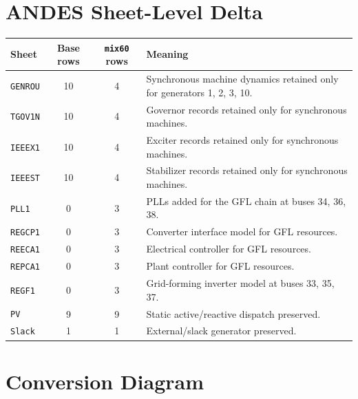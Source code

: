\documentclass[10pt,letterpaper]{article}
\begin{document}
\section{ANDES Sheet-Level Delta}

\begin{center}
\begin{tabular}{lccp{6.2cm}}
\toprule
Sheet & Base rows & \texttt{mix60} rows & Meaning \\
\midrule
\texttt{GENROU} & 10 & 4 & Synchronous machine dynamics retained only for generators 1, 2, 3, 10. \\
\texttt{TGOV1N} & 10 & 4 & Governor records retained only for synchronous machines. \\
\texttt{IEEEX1} & 10 & 4 & Exciter records retained only for synchronous machines. \\
\texttt{IEEEST} & 10 & 4 & Stabilizer records retained only for synchronous machines. \\
\texttt{PLL1} & 0 & 3 & PLLs added for the GFL chain at buses 34, 36, 38. \\
\texttt{REGCP1} & 0 & 3 & Converter interface model for GFL resources. \\
\texttt{REECA1} & 0 & 3 & Electrical controller for GFL resources. \\
\texttt{REPCA1} & 0 & 3 & Plant controller for GFL resources. \\
\texttt{REGF1} & 0 & 3 & Grid-forming inverter model at buses 33, 35, 37. \\
\texttt{PV} & 9 & 9 & Static active/reactive dispatch preserved. \\
\texttt{Slack} & 1 & 1 & External/slack generator preserved. \\
\bottomrule
\end{tabular}
\end{center}

\section{Conversion Diagram}
\end{document}
